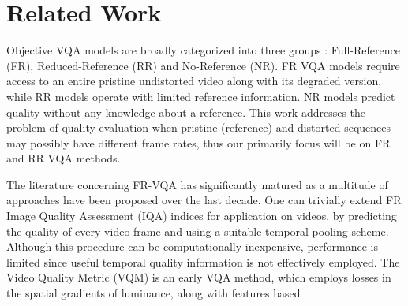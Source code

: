 \documentclass[journal]{IEEEtran}
\begin{document}
\section{Related Work}
\label{sec:prior_work}
Objective VQA models are broadly categorized into three groups \cite{chikkerur2011objective}: Full-Reference (FR), Reduced-Reference (RR) and No-Reference (NR). FR VQA models require access to an entire pristine undistorted video along with its degraded version, while RR models operate with limited reference information. NR models predict quality without any knowledge about a reference. This work addresses the problem of quality evaluation when pristine (reference) and distorted sequences may possibly have different frame rates, thus our primarily focus will be on FR and RR VQA methods.

The literature concerning FR-VQA has significantly matured as a multitude of approaches have been proposed over the last decade. One can trivially extend FR Image Quality Assessment (IQA) indices \cite{wang2004image,wang2003multiscale,zhang2011fsim} for application on videos, by predicting the quality of every video frame and using a suitable temporal pooling scheme. Although this procedure can be computationally inexpensive, performance is limited since useful temporal quality information is not effectively employed. The Video Quality Metric (VQM) \cite{pinson2004new} is an early VQA method, which employs losses in the spatial gradients of luminance, along with features based
\end{document}
